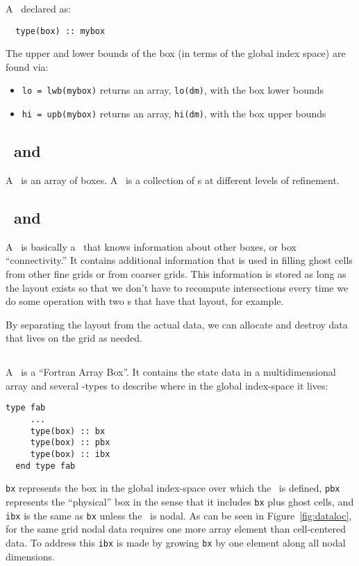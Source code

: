 A \boxtype\ declared as:
\begin{verbatim}
  type(box) :: mybox
\end{verbatim}
%
The upper and lower bounds of the box (in terms of the global
index space) are found via:
\begin{itemize}

\item {\tt lo = lwb(mybox)} returns an array, {\tt lo(dm)}, with
     the box lower bounds

\item {\tt hi = upb(mybox)} returns an array, {\tt hi(dm)}, with
     the box upper bounds

\end{itemize}




\subsection{\boxarray\ and \mlboxarray}

A \boxarray\ is an array of boxes.  A \mlboxarray\ is a collection of
\boxarray s at different levels of refinement.

\subsection{\layout\ and \mllayout}

A \layout\ is basically a \boxarray\ that knows information about other
boxes, or box ``connectivity.''  It contains additional information
that is used in filling ghost cells from other fine grids or from
coarser grids.  This information is stored as long as the layout
exists so that we don't have to recompute intersections every time we
do some operation with two \multifab s that have that layout, for
example.

By separating the layout from the actual data, we can allocate and
destroy data that lives on the grid as needed.


\subsection{\fab}

A \fab\ is a ``Fortran Array Box''.  It contains the state data in a
multidimensional array and several \boxtype-types to describe where in
the global index-space it lives:
\begin{lstlisting}[language={[95]fortran},mathescape=false]
  type fab
     ...
     type(box) :: bx
     type(box) :: pbx
     type(box) :: ibx
  end type fab
\end{lstlisting}
{\tt bx} represents the box in the global index-space over which the
\fab\ is defined, {\tt pbx} represents the ``physical'' box in the
sense that it includes {\tt bx} plus ghost cells, and {\tt ibx} is the
same as {\tt bx} unless the \fab\ is nodal.  As can be seen in
Figure~\ref{fig:dataloc}, for the same grid nodal data requires one
more array element than cell-centered data.  To address this {\tt ibx}
is made by growing {\tt bx} by one element along all nodal dimensions.

